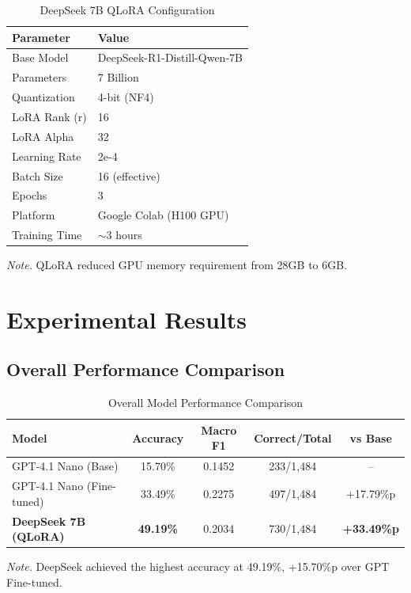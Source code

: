 \documentclass[11pt, a4paper]{article}
\begin{document}
\begin{table}[H]
\centering
\caption{DeepSeek 7B QLoRA Configuration}
\label{tab:deepseek_config}
\begin{tabular}{ll}
\toprule
\textbf{Parameter} & \textbf{Value} \\
\midrule
Base Model & DeepSeek-R1-Distill-Qwen-7B \\
Parameters & 7 Billion \\
Quantization & 4-bit (NF4) \\
LoRA Rank (r) & 16 \\
LoRA Alpha & 32 \\
Learning Rate & 2e-4 \\
Batch Size & 16 (effective) \\
Epochs & 3 \\
Platform & Google Colab (H100 GPU) \\
Training Time & $\sim$3 hours \\
\bottomrule
\end{tabular}

\vspace{0.5em}
\footnotesize\textit{Note.} QLoRA reduced GPU memory requirement from 28GB to 6GB.
\end{table}

\section{Experimental Results}

\subsection{Overall Performance Comparison}

\begin{table}[H]
\centering
\caption{Overall Model Performance Comparison}
\label{tab:overall_results}
\begin{tabular}{lcccc}
\toprule
\textbf{Model} & \textbf{Accuracy} & \textbf{Macro F1} & \textbf{Correct/Total} & \textbf{vs Base} \\
\midrule
GPT-4.1 Nano (Base) & 15.70\% & 0.1452 & 233/1,484 & -- \\
GPT-4.1 Nano (Fine-tuned) & 33.49\% & 0.2275 & 497/1,484 & +17.79\%p \\
\textbf{DeepSeek 7B (QLoRA)} & \textbf{49.19\%} & 0.2034 & 730/1,484 & \textbf{+33.49\%p} \\
\bottomrule
\end{tabular}

\vspace{0.5em}
\footnotesize\textit{Note.} DeepSeek achieved the highest accuracy at 49.19\%, +15.70\%p over GPT Fine-tuned.
\end{table}
\end{document}
